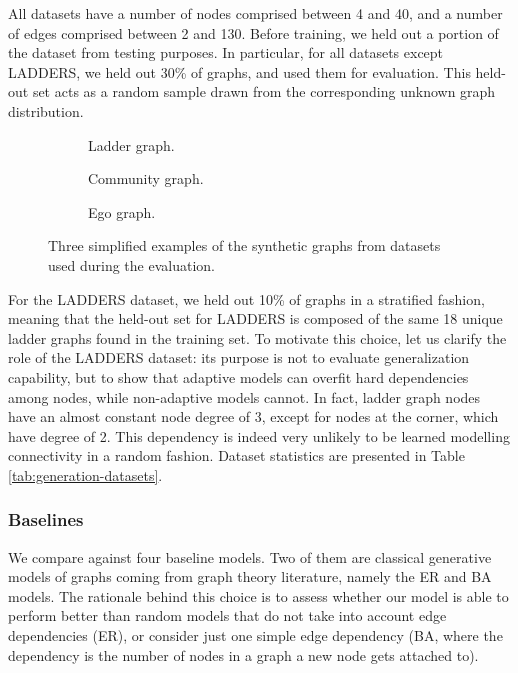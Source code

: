 All datasets have a number of nodes comprised between 4 and 40, and a number of edges comprised between 2 and 130. Before training, we held out a portion of the dataset from testing purposes. In particular, for all datasets except LADDERS, we held out 30\% of graphs, and used them for evaluation. This held-out set acts as a random sample drawn from the corresponding unknown graph distribution.
\begin{figure}[h!]
    \begin{subfigure}[b]{0.25\linewidth}
        \centering
        \resizebox{.55\textwidth}{!}{}
        \caption{Ladder graph.}
        \label{fig:ladder}
    \end{subfigure}
    \begin{subfigure}[b]{0.43\linewidth}
        \centering
        \resizebox{.8\textwidth}{!}{}
        \caption{Community graph.}
        \label{fig:community}
    \end{subfigure}
    \begin{subfigure}[b]{0.30\linewidth}
        \centering
        \resizebox{.8\textwidth}{!}{}
        \caption{Ego graph.}
        \label{fig:ego}
    \end{subfigure}
    \caption{Three simplified examples of the synthetic graphs from datasets used during the evaluation.}
    \label{fig:synthetic-graphs}
\end{figure}
For the LADDERS dataset, we held out 10\% of graphs in a stratified fashion, meaning that the held-out set for LADDERS is composed of the same 18 unique ladder graphs found in the training set. To motivate this choice, let us clarify the role of the LADDERS dataset: its purpose is not to evaluate generalization capability, but to show that adaptive models can overfit hard dependencies among nodes, while non-adaptive models cannot. In fact, ladder graph nodes have an almost constant node degree of 3, except for nodes at the corner, which have degree of 2. This dependency is indeed very unlikely to be learned modelling connectivity in a random fashion. Dataset statistics are presented in Table \ref{tab:generation-datasets}.



\subsubsection*{Baselines}
We compare against four baseline models. Two of them are classical generative models of graphs coming from graph theory literature, namely the ER and BA models. The rationale behind this choice is to assess whether our model is able to perform better than random models that do not take into account edge dependencies (ER), or consider just one simple edge dependency (BA, where the dependency is the number of nodes in a graph a new node gets attached to).

